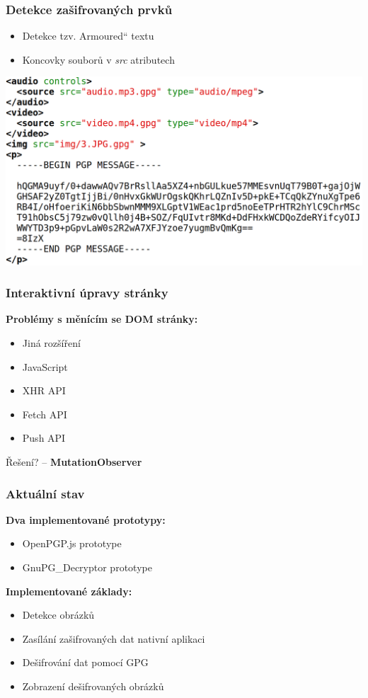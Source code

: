 \documentclass[10pt,xcolor=pdflatex]{beamer}
\newcommand{\czuv}[1]{\quotedblbase #1\textquotedblleft}
\begin{document}
\begin{frame}
    \frametitle{Detekce zašifrovaných prvků}
    \begin{itemize}
        \item Detekce tzv. \czuv{Armoured} textu
        \item Koncovky souborů v \textit{src} atributech
    \end{itemize}
    \medskip
    \includegraphics[height=0.6\textheight,keepaspectratio]{img/encrypted.png}
\end{frame}

\begin{frame}
    \frametitle{Interaktivní úpravy stránky}
    \textbf{Problémy s měnícím se DOM stránky:}
    \begin{itemize}
        \item Jiná rozšíření
        \item JavaScript
        \item XHR API
        \item Fetch API
        \item Push API
    \end{itemize}
    \medskip
    Řešení? -- \textbf{MutationObserver}
\end{frame}

\begin{frame}
    \frametitle{Aktuální stav}
    \textbf{Dva implementované prototypy:}
    \begin{itemize}
        \item OpenPGP.js prototype
        \item GnuPG\_Decryptor prototype
    \end{itemize}
    \medskip
    \textbf{Implementované základy:}
    \begin{itemize}
        \item Detekce obrázků
        \item Zasílání zašifrovaných dat nativní aplikaci
        \item Dešifrování dat pomocí GPG
        \item Zobrazení dešifrovaných obrázků
    \end{itemize}
\end{frame}
\end{document}
